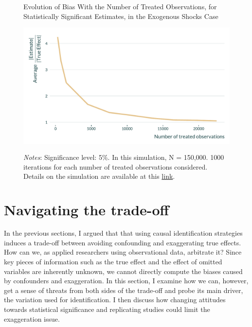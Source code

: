 \documentclass[usletter, 12pt]{article}
\begin{document}
			\begin{figure}[!h] 
                    			\begin{center}
                    				\caption{Evolution of Bias With the Number of Treated Observations, for Statistically Significant Estimates, in the Exogenous Shocks Case}
                    				\label{graph_shocks}
                    				\includegraphics[width=0.8\linewidth]{images/main_graph_DID_paper.pdf}
                                    \caption*{\footnotesize \textit{Notes}: Significance level: 5\%. In this simulation, N = 150,000. 1000 iterations for each number of treated observations considered. Details on the simulation are available at this \href{https://vincentbagilet.github.io/causal_exaggeration/shocks.html}{link}.}
                                    \end{center}
				\vspace{-1cm}
                    		\end{figure} 
		
		



	\section{Navigating the trade-off} \label{discussion}

 		In the previous sections, I argued that that using causal identification strategies induces a trade-off between avoiding confounding and exaggerating true effects. How can we, as applied researchers using observational data, arbitrate it? Since key pieces of information such as the true effect and the effect of omitted variables are inherently unknown, we cannot directly compute the biases caused by confounders and exaggeration. In this section, I examine how we can, however, get a sense of threats from both sides of the trade-off and probe its main driver, the variation used for identification. I then discuss how changing attitudes towards statistical significance and replicating studies could limit the exaggeration issue.
	
\end{document}
